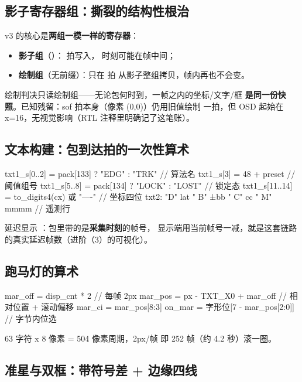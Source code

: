 \subsection{影子寄存器组：撕裂的结构性根治}

v3 的核心是\textbf{两组一模一样的寄存器}：

\begin{itemize}
  \item \textbf{影子组}（）： 拍写入，
    时刻可能在帧中间；
  \item \textbf{绘制组}（无前缀）：只在  拍
    从影子整组拷贝，帧内再也不会变。
\end{itemize}

绘制判决只读绘制组——无论包何时到，一帧之内的坐标/文字/框
\textbf{是同一份快照}。已知残留：sof 拍本身（像素 (0,0)）仍用旧值绘制
一拍，但 OSD 起始在 x=16，无视觉影响（RTL 注释里明确记了这笔账）。

\subsection{文本构建：包到达拍的一次性算术}

\begin{Verilog}
txt1_s[0..2] = pack[133] ? "EDG" : "TRK"      // 算法名
txt1_s[3]    = 48 + preset                     // 阈值组号
txt1_s[5..8] = pack[134] ? "LOCK" : "LOST"    // 锁定态
txt1_s[11..14] = to_digits4(cx) 或 "----"      // 坐标四位
txt2: "D" lat " B" ±bb " C" cc " M" mmmm       // 遥测行
\end{Verilog}

延迟显示 ：包里带的是\textbf{采集时刻}的帧号，
显示端用当前帧号一减，就是这套链路的真实延迟帧数（进阶（3）的可视化）。

\subsection{跑马灯的算术}

\begin{Verilog}
mar_off = disp_cnt * 2                  // 每帧 2px
mar_pos = px - TXT_X0 + mar_off         // 相对位置 + 滚动偏移
mar_ci  = mar_pos[8:3] %
on_mar  = 字形位[7 - mar_pos[2:0]]      // 字节内位选
\end{Verilog}

63 字符 x 8 像素 = 504 像素周期，2px/帧 即 252 帧（约 4.2 秒）滚一圈。

\subsection{准星与双框：带符号差 + 边缘四线}

